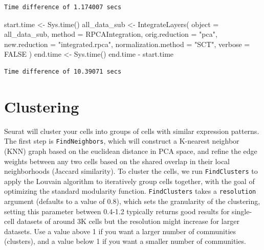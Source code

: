 \documentclass[
  letterpaper,
  DIV=11,
  numbers=noendperiod]{scrreprt}
\newenvironment{Shaded}{\begin{snugshade}}{\end{snugshade}}
\newcommand{\AttributeTok}[1]{\textcolor[rgb]{0.40,0.45,0.13}{#1}}
\newcommand{\ConstantTok}[1]{\textcolor[rgb]{0.56,0.35,0.01}{#1}}
\newcommand{\FunctionTok}[1]{\textcolor[rgb]{0.28,0.35,0.67}{#1}}
\newcommand{\NormalTok}[1]{\textcolor[rgb]{0.00,0.23,0.31}{#1}}
\newcommand{\OtherTok}[1]{\textcolor[rgb]{0.00,0.23,0.31}{#1}}
\newcommand{\SpecialCharTok}[1]{\textcolor[rgb]{0.37,0.37,0.37}{#1}}
\newcommand{\StringTok}[1]{\textcolor[rgb]{0.13,0.47,0.30}{#1}}
\begin{document}
\begin{verbatim}
Time difference of 1.174007 secs
\end{verbatim}

\begin{Shaded}
\begin{Highlighting}[]
\NormalTok{start.time }\OtherTok{\textless{}{-}} \FunctionTok{Sys.time}\NormalTok{()}
\NormalTok{all\_data\_sub }\OtherTok{\textless{}{-}} \FunctionTok{IntegrateLayers}\NormalTok{(}
  \AttributeTok{object =}\NormalTok{ all\_data\_sub, }\AttributeTok{method =}\NormalTok{ RPCAIntegration,}
  \AttributeTok{orig.reduction =} \StringTok{"pca"}\NormalTok{, }\AttributeTok{new.reduction =} \StringTok{"integrated.rpca"}\NormalTok{, }\AttributeTok{normalization.method =} \StringTok{"SCT"}\NormalTok{,}
  \AttributeTok{verbose =} \ConstantTok{FALSE}
\NormalTok{)}
\NormalTok{end.time }\OtherTok{\textless{}{-}} \FunctionTok{Sys.time}\NormalTok{()}
\NormalTok{end.time }\SpecialCharTok{{-}}\NormalTok{ start.time}
\end{Highlighting}
\end{Shaded}

\begin{verbatim}
Time difference of 10.39071 secs
\end{verbatim}

\section{Clustering}\label{clustering}

Seurat will cluster your cells into groups of cells with similar
expression patterns. The first step is \texttt{FindNeighbors}, which
will construct a K-nearest neighbor (KNN) graph based on the euclidean
distance in PCA space, and refine the edge weights between any two cells
based on the shared overlap in their local neighborhoods (Jaccard
similarity). To cluster the cells, we run \texttt{FindClusters} to apply
the Louvain algorithm to iteratively group cells together, with the goal
of optimizing the standard modularity function. \texttt{FindClusters}
takes a \texttt{resolution} argument (defaults to a value of 0.8), which
sets the granularity of the clustering, setting this parameter between
0.4-1.2 typically returns good results for single-cell datasets of
around 3K cells but the resolution might increase for larger datasets.
Use a value above 1 if you want a larger number of communities
(clusters), and a value below 1 if you want a smaller number of
communities.
\end{document}

